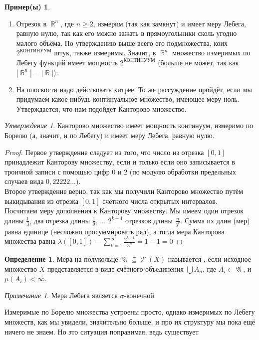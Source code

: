 \documentclass[a4paper]{article}
\theoremstyle{indented}
\theoremstyle{definition}
\newtheorem{defn}{Определение}
\newtheorem{exl}{Пример(ы)}
\theoremstyle{remark}
\newtheorem{remark}{Примечание}
\newtheorem{stat}{Утверждение}
\DeclareMathOperator{\RR}{\mathbb{R}}
\DeclareMathOperator{\GA}{\mathfrak{A}}
\DeclareMathOperator{\Rho}{\mathcal{P}}
\begin{document}
\begin{exl}
\begin{enumerate}
    \item Отрезок в $\RR^n$, где $n \geq 2$, измерим (так как замкнут) и имеет меру Лебега, равную нулю, так как его можно зажать в прямоугольники сколь угодно малого объёма. По утверждению выше всего его подмножества, коих $2^{\text{КОНТИНУУМ}}$ штук, также измеримы. Значит, в $\RR^n$ множество измеримых по Лебегу функций имеет мощность $2^{\text{КОНТИНУУМ}}$ (больше не может, так как $|\RR^n| = |\RR|$).
    \item На плоскости надо действовать хитрее. То же рассуждение пройдёт, если мы придумаем какое-нибудь континуальное множество, имеющее меру ноль. Утверждается, что нам подойдёт Канторово множество.
\end{enumerate}
\begin{stat}
Канторово множество имеет мощность континуум, измеримо по Борелю (а, значит, и по Лебегу) и имеет меру Лебега, равную нулю.
\end{stat}
\begin{proof}
Первое утверждение следует из того, что число из отрезка $[0, 1]$ принадлежит Канторову множеству, если и только если оно записывается в троичной записи с помощью цифр $0$ и $2$ (по модулю обработки предельных случаев вида $0,22222...$).
\\
Второе утверждение верно, так как мы получили Канторово множество путём выкидывания из отрезка $[0, 1]$ счётного числа открытых интервалов.
\\
Посчитаем меру дополнения к Канторову множеству. Мы имеем один отрезок длины $\frac{1}{3}$, два отрезка длины $\frac{1}{9}$, ... $2^{k-1}$ отрезков длины $\frac{n}{3^k}$. Сумма их длин (мер) равна единице (несложно просуммировать ряд), а тогда мера Канторова множества равна $\lambda([0, 1])-\sum_{k=1}^{\infty} \frac{2^{k-1}}{3^k} = 1-1=0$
\end{proof}
\end{exl}
\begin{defn}
Мера на полукольце $\GA\subseteq \Rho(X)$ называется , если исходное множество $X$ представляется в виде счётного объединения $\bigcup A_n$, где $A_i \in \GA$, и $\mu(A_i) < \infty$.
\end{defn}
\begin{remark}
Мера Лебега является $\sigma$-конечной.
\end{remark}
Измеримые по Борелю множества устроены просто, однако измеримых по Лебегу множеств, как мы увидели, значительно больше, и про их структуру мы пока ещё ничего не знаем. Но это ситуация поправимая, ведь существует
\end{document}
